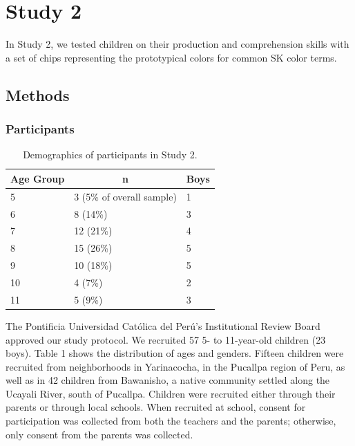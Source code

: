 \documentclass[
  english,
  ,man,floatsintext]{apa6}
\begin{document}
\hypertarget{study-2}{%
\section{Study 2}\label{study-2}}

In Study 2, we tested children on their production and comprehension skills with a set of chips representing the prototypical colors for common SK color terms.

\hypertarget{methods-1}{%
\subsection{Methods}\label{methods-1}}

\hypertarget{participants-1}{%
\subsubsection{Participants}\label{participants-1}}

\begin{table}[tbp]

\begin{center}
\begin{threeparttable}

\caption{\label{tab:unnamed-chunk-2}Demographics of participants in Study 2.}

\begin{tabular}{lll}
\toprule
Age Group & \multicolumn{1}{c}{n} & \multicolumn{1}{c}{Boys}\\
\midrule
5 & 3 (5\% of overall sample) & 1\\
6 & 8 (14\%) & 3\\
7 & 12 (21\%) & 4\\
8 & 15 (26\%) & 5\\
9 & 10 (18\%) & 5\\
10 & 4 (7\%) & 2\\
11 & 5 (9\%) & 3\\
\bottomrule
\end{tabular}

\end{threeparttable}
\end{center}

\end{table}

The Pontificia Universidad Católica del Perú's Institutional Review Board approved our study protocol. We recruited 57 5- to 11-year-old children (23 boys). Table 1 shows the distribution of ages and genders. Fifteen children were recruited from neighborhoods in Yarinacocha, in the Pucallpa region of Peru, as well as in 42 children from Bawanisho, a native community settled along the Ucayali River, south of Pucallpa. Children were recruited either through their parents or through local schools. When recruited at school, consent for participation was collected from both the teachers and the parents; otherwise, only consent from the parents was collected.
\end{document}
